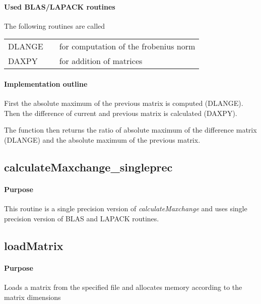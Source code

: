 \documentclass[a4paper,10pt]{scrartcl}
\begin{document}
			\paragraph{Used BLAS/LAPACK routines}

			The following routines are called\newline

			\begin{tabular}{lcl}
				DLANGE && for computation of the frobenius norm\\
				DAXPY && for addition of matrices\\
			\end{tabular}

			\paragraph{Implementation outline}

			First the absolute maximum of the previous matrix is computed (DLANGE). Then the difference
			of current and previous matrix is calculated (DAXPY).\newline

			The function then returns the ratio of absolute maximum of the difference matrix (DLANGE) and
			the absolute maximum of the previous matrix.\newline


		\subsection{calculateMaxchange\_singleprec}


			\paragraph{Purpose}

			This routine is a single precision version of \emph{calculateMaxchange} and uses single precision version
			of BLAS and LAPACK routines.


		\subsection{loadMatrix}

			\paragraph{Purpose}

			Loads a matrix from the specified file and allocates memory according to the matrix dimensions
\end{document}
